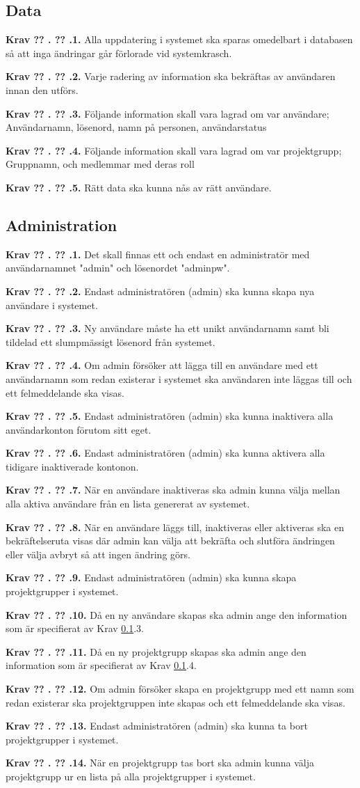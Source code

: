 \documentclass[a4paper]{article}
\newcommand\getcurrentref[1]{%
 \ifnumequal{\value{#1}}{0}
  {??}
  {\the\value{#1}}%
}
\newcommand\requirement[2]{
	\numberedrow{Krav}{#1}{#2}
}
\newcommand\numberedrow[3]{
	\noindent
	\textbf{#1 \getcurrentref{section}.\getcurrentref{subsection}.#2.} #3
	
}
\begin{document}
\subsection{Data}
\label{krav-funk-data}
\requirement{1}{Alla uppdatering i systemet ska sparas omedelbart i databasen så att inga ändringar går förlorade vid systemkrasch.}
\requirement{2}{Varje radering av information ska bekräftas av användaren innan den utförs.}
\requirement{3}{Följande information skall vara lagrad om var användare; Användarnamn, lösenord, namn på personen, användarstatus}
\requirement{4}{Följande information skall vara lagrad om var projektgrupp; Gruppnamn, och medlemmar med deras roll}
\requirement{5}{Rätt data ska kunna nås av rätt användare.}
\subsection{Administration}
\requirement{1}{Det skall finnas ett och endast en administratör med användarnamnet "admin" och lösenordet "adminpw".}
\requirement{2}{Endast administratören (admin) ska kunna skapa nya användare i systemet.}
\requirement{3}{Ny användare måste ha ett unikt användarnamn samt bli tildelad ett slumpmässigt lösenord från systemet.}
\requirement{4}{Om admin försöker att lägga till en användare med ett användarnamn som redan existerar i systemet ska användaren inte läggas till och ett felmeddelande ska visas.}
\requirement{5}{Endast administratören (admin) ska kunna inaktivera alla användarkonton förutom sitt eget.}
\requirement{6}{Endast administratören (admin) ska kunna aktivera alla tidigare inaktiverade kontonon.}
\requirement{7}{När en användare inaktiveras ska admin kunna välja mellan alla aktiva användare från en lista genererat av systemet.}
\requirement{8}{När en användare läggs till, inaktiveras eller aktiveras ska en bekräftelseruta visas där admin kan välja att bekräfta och slutföra ändringen eller välja avbryt så att ingen ändring görs.}
\requirement{9}{Endast administratören (admin) ska kunna skapa projektgrupper i systemet.}
\requirement{10}{Då en ny användare skapas ska admin ange den information som är specifierat av Krav \ref{krav-funk-data}.3.}
\requirement{11}{Då en ny projektgrupp skapas ska admin ange den information som är specifierat av Krav \ref{krav-funk-data}.4.}
\requirement{12}{Om admin försöker skapa en projektgrupp med ett namn som redan existerar ska projektgruppen inte skapas och ett felmeddelande ska visas.}
\requirement{13}{Endast administratören (admin) ska kunna ta bort projektgrupper i systemet.}
\requirement{14}{När en projektgrupp tas bort ska admin kunna välja projektgrupp ur en lista på alla projektgrupper i systemet.}
\end{document}
